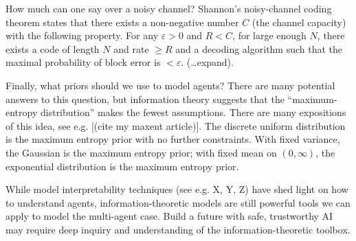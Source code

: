 \documentclass[11pt]{article}
\begin{document}
How much can one say over a noisy channel?  Shannon's noisy-channel coding theorem states that there exists a non-negative number $C$ (the channel capacity) with the following property.  For any $\varepsilon > 0$ and $R < C$, for large enough $N$, there exists a code of length $N$ and rate $\geq R$ and a decoding algorithm such that the maximal probability of block error is $< \varepsilon$.  (\dots expand).

Finally, what priors should we use to model agents?  There are many potential answers to this question, but information theory suggests that the ``maximum-entropy distribution'' makes the fewest assumptions.  There are many expositions of this idea, see e.g. [(cite my maxent article)].  The discrete uniform distribution is the maximum entropy prior with no further constraints.  With fixed variance, the Gaussian is the maximum entropy prior; with fixed mean on $(0, \infty)$, the exponential distribution is the maximum entropy prior.


While model interpretability techniques (see e.g. X, Y, Z) have shed light on how to understand agents, information-theoretic models are still powerful tools we can apply to model the multi-agent case.  Build a future with safe, trustworthy AI may require deep inquiry and understanding of the information-theoretic toolbox.

\newpage


\nocite{*}

\end{document}
